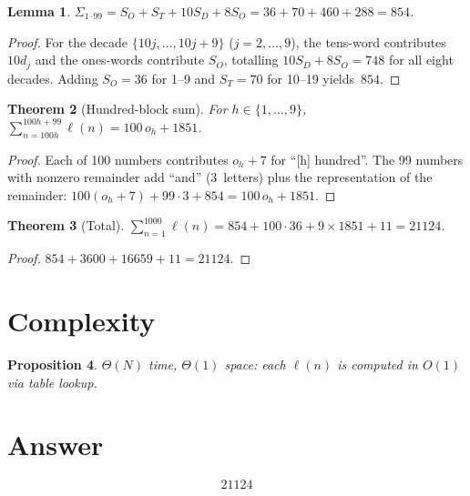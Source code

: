 \documentclass[12pt,a4paper]{article}
\newtheorem{theorem}{Theorem}
\newtheorem{lemma}[theorem]{Lemma}
\newtheorem{proposition}[theorem]{Proposition}
\theoremstyle{definition}
\begin{document}
\begin{lemma}
$\Sigma_{1\text{--}99} = S_O + S_T + 10 S_D + 8 S_O = 36 + 70 + 460 + 288 = 854$.
\end{lemma}

\begin{proof}
For the decade $\{10j, \ldots, 10j + 9\}$ ($j = 2, \ldots, 9$), the tens-word contributes
$10 d_j$ and the ones-words contribute $S_O$, totalling $10 S_D + 8 S_O = 748$ for all
eight decades. Adding $S_O = 36$ for 1--9 and $S_T = 70$ for 10--19 yields~$854$.
\end{proof}

\begin{theorem}[Hundred-block sum]
For $h \in \{1,\ldots,9\}$, $\sum_{n=100h}^{100h+99} \ell(n) = 100\,o_h + 1851$.
\end{theorem}

\begin{proof}
Each of 100 numbers contributes $o_h + 7$ for ``[h] hundred''. The 99 numbers with nonzero
remainder add ``and'' (3~letters) plus the representation of the remainder:
$100(o_h + 7) + 99 \cdot 3 + 854 = 100\,o_h + 1851$.
\end{proof}

\begin{theorem}[Total]
$\displaystyle\sum_{n=1}^{1000} \ell(n) = 854 + 100 \cdot 36 + 9 \times 1851 + 11 = 21124$.
\end{theorem}

\begin{proof}
$854 + 3600 + 16659 + 11 = 21124$.
\end{proof}

\section{Complexity}

\begin{proposition}
$\Theta(N)$ time, $\Theta(1)$ space: each $\ell(n)$ is computed in $O(1)$ via table lookup.
\end{proposition}

\section{Answer}

\[
\boxed{21124}
\]
\end{document}
